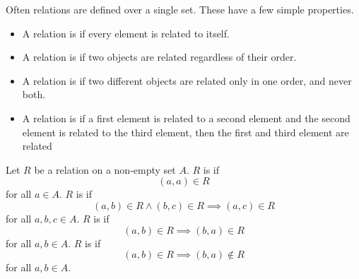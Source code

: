 

Often relations
are defined over a single
set.
These have a few simple
properties.


\begin{itemize}

\item
A relation is
if every element
is related to itself.

\item
A relation is
if two objects are related
regardless of their order.

\item
A relation is
if two different objects are related only
in one order, and never both.

\item
A relation is
if a first element is
related to a second element
and the second element
is related to the third element,
then the first and third
element are related
\end{itemize}


Let $R$ be a relation on
a non-empty set $A$.
$R$ is  if
$$(a, a) \in R$$
for all $a \in A$.
$R$ is  if
$$(a, b) \in R \land (b, c) \in R \implies (a, c) \in R$$
for all $a, b, c \in A$.
$R$ is  if
$$(a, b) \in R \implies (b, a) \in R$$
for all $a, b \in A$.
$R$ is  if
$$(a, b) \in R \implies (b, a) \not\in R$$
for all $a, b \in A$.

\strats
